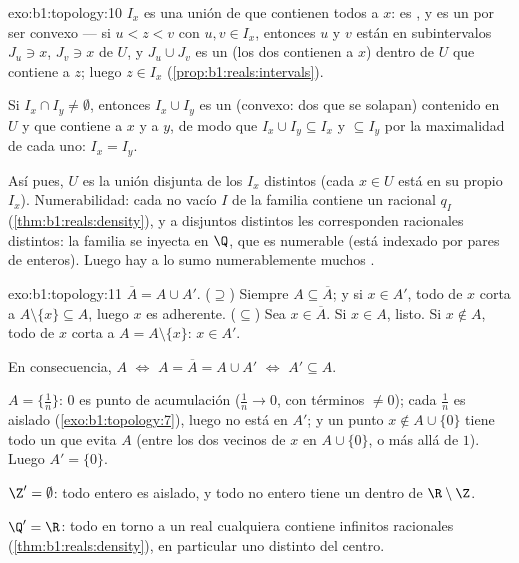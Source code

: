 \begin{solution}{exo:b1:topology:10}
$I_x$ es una unión de   que contienen todos a $x$:
es , y es un  por ser convexo --- si $u < z < v$ con
$u, v \in I_x$, entonces $u$ y $v$ están en subintervalos 
$J_u \ni x$, $J_v \ni x$ de $U$, y $J_u \cup J_v$ es un 
(los dos contienen a $x$) dentro de $U$ que contiene a $z$; luego
$z \in I_x$ (\cref{prop:b1:reals:intervals}).

Si $I_x \cap I_y \neq \emptyset$, entonces $I_x \cup I_y$ es un
  (convexo: dos  que se solapan)
contenido en $U$ y que contiene a $x$ y a $y$, de modo que
$I_x \cup I_y \subseteq I_x$ y $\subseteq I_y$ por la maximalidad de
cada uno: $I_x = I_y$.

Así pues, $U$ es la unión disjunta de los  $I_x$ distintos
(cada $x \in U$ está en su propio $I_x$). Numerabilidad: cada
  no vacío $I$ de la familia contiene un racional
$q_I$ (\cref{thm:b1:reals:density}), y a  disjuntos
distintos les corresponden racionales distintos: la familia se
inyecta en $\Q$, que es numerable (está indexado por pares de
enteros). Luego hay a lo sumo numerablemente muchos .
\end{solution}

\begin{solution}{exo:b1:topology:11}
$\overline A = A \cup A'$. ($\supseteq$) Siempre
$A \subseteq \overline A$; y si $x \in A'$, todo  de $x$
corta a $A \setminus \{x\} \subseteq A$, luego $x$ es adherente.
($\subseteq$) Sea $x \in \overline A$. Si $x \in A$, listo. Si
$x \notin A$, todo  de $x$ corta a $A = A \setminus \{x\}$:
$x \in A'$.

En consecuencia, $A$  $\iff$ $A = \overline A = A \cup A'$
$\iff$ $A' \subseteq A$.

$A = \{\frac 1n\}$: $0$ es punto de acumulación ($\frac 1n \to 0$,
con términos $\neq 0$); cada $\frac 1n$ es aislado
(\cref{exo:b1:topology:7}), luego no está en $A'$; y un punto
$x \notin A \cup \{0\}$ tiene todo un  que evita $A$ (entre
los dos vecinos de $x$ en $A \cup \{0\}$, o más allá de $1$). Luego
$A' = \{0\}$.

$\Z' = \emptyset$: todo entero es aislado, y todo no entero tiene un
 dentro de $\R \setminus \Z$.

$\Q' = \R$: todo  en torno a un real cualquiera contiene
infinitos racionales (\cref{thm:b1:reals:density}), en particular uno
distinto del centro.
\end{solution}

